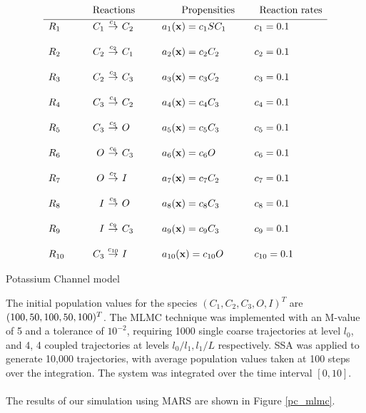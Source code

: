 \documentclass[ugrad,lot,lof,openright,11pt,oneside,onehalfspace]{RUthesis}
\begin{document}
			\begin{table}[H]
			\[
			\begin{array}{l@{\hspace*{10mm}}r@{\ }c@{\ }l@{\hspace*{10mm}}l@{\hspace*{10mm}}l}
			\multicolumn{4}{c}{\text{{\huge\phantom{$I_{I_I}$}}Reactions}} & \multicolumn{1}{c}{\text{Propensities}} & \multicolumn{1}{c}{\text{Reaction rates}}\\
			\hline
			R_1 	& C_1 & \stackrel{c_1}{\rightarrow} & C_2 	& a_1(\mathbf{x}) = c_1 S C_1 	& c_1 = 0.1
			\\\\
			R_2 	& C_2 & \stackrel{c_2}{\rightarrow} & C_1  	& a_2(\mathbf{x}) = c_2 C_2		& c_2 = 0.1
			\\\\
			R_3 	& C_2 & \stackrel{c_3}{\rightarrow} & C_3 	& a_3(\mathbf{x}) = c_3 C_2		& c_3 = 0.1
			\\\\
			R_4 	& C_3 & \stackrel{c_4}{\rightarrow} & C_2 	& a_4(\mathbf{x}) = c_4 C_3		& c_4 = 0.1
			\\\\
			R_5 	& C_3 & \stackrel{c_5}{\rightarrow} & O 	& a_5(\mathbf{x}) = c_5 C_3		& c_5 = 0.1
			\\\\
			R_6 	& O & \stackrel{c_6}{\rightarrow} & C_3 	& a_6(\mathbf{x}) = c_6 O		& c_6 = 0.1
			\\\\
			R_7 	& O & \stackrel{c_7}{\rightarrow} & I 		& a_7(\mathbf{x}) = c_7 C_2		& c_7 = 0.1
			\\\\
			R_8 	& I & \stackrel{c_8}{\rightarrow} & O 		& a_8(\mathbf{x}) = c_8 C_3		& c_8 = 0.1
			\\\\
			R_9 	& I & \stackrel{c_9}{\rightarrow} & C_3 	& a_9(\mathbf{x}) = c_9 C_3		& c_9 = 0.1
			\\\\
			R_{10} 	& C_3 & \stackrel{c_{10}}{\rightarrow} & I 	& a_{10}(\mathbf{x}) = c_{10} O	& c_{10} = 0.1
			\end{array}
			\]
			\captionsetup{width=0.8\textwidth}
			\caption{Potassium Channel model}
			\label{pc_table}
			\end{table}

			\noindent
			The initial population values for the species $(C_1,C_2,C_3,O,I)^T$ are $(100,50,100,50,\\100)^T$. The MLMC technique was implemented with an M-value of 5 and a tolerance of $10^{-2}$, requiring 1000 single coarse trajectories at level $l_0$, and 4, 4 coupled trajectories at levels $l_0/l_1,l_1/L$ respectively. SSA was applied to generate 10,000 trajectories, with average population values taken at 100 steps over the integration. The system was integrated over the time interval $[0,10]$.\\
			\\
			The results of our simulation using MARS are shown in Figure \ref{pc_mlmc}.
\end{document}
